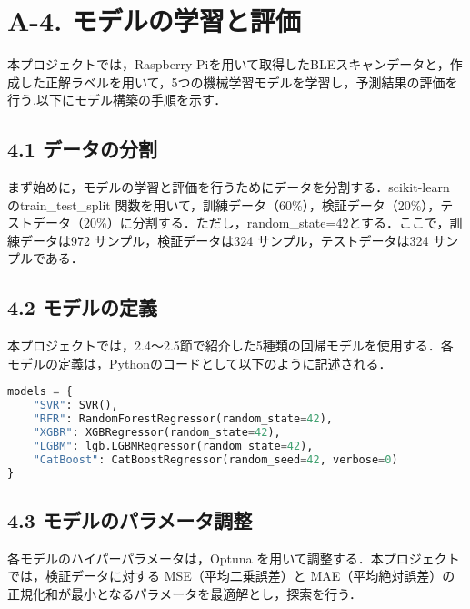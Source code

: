 \section*{A-4. モデルの学習と評価}
本プロジェクトでは，Raspberry Piを用いて取得したBLEスキャンデータと，作成した正解ラベルを用いて，5つの機械学習モデルを学習し，予測結果の評価を行う.以下にモデル構築の手順を示す．

\subsection*{4.1 データの分割}
まず始めに，モデルの学習と評価を行うためにデータを分割する．scikit-learn\cite{scikit-learn} のtrain\_test\_split 関数を用いて，訓練データ（60\%），検証データ（20\%），テストデータ（20\%）に分割する．ただし，random\_state=42とする．ここで，訓練データは972 サンプル，検証データは324 サンプル，テストデータは324 サンプルである．

\subsection*{4.2 モデルの定義}
本プロジェクトでは，2.4～2.5節で紹介した5種類の回帰モデルを使用する．各モデルの定義は，Pythonのコードとして以下のように記述される．
\begin{lstlisting}[style=mystyle, language=Python, caption=回帰モデルの定義, label={models}]
models = {
    "SVR": SVR(),
    "RFR": RandomForestRegressor(random_state=42),
    "XGBR": XGBRegressor(random_state=42),
    "LGBM": lgb.LGBMRegressor(random_state=42),
    "CatBoost": CatBoostRegressor(random_seed=42, verbose=0)
}
\end{lstlisting}

\subsection*{4.3 モデルのパラメータ調整}
各モデルのハイパーパラメータは，Optuna\cite{akiba2019optuna} を用いて調整する．本プロジェクトでは，検証データに対する MSE（平均二乗誤差）と MAE（平均絶対誤差）の正規化和が最小となるパラメータを最適解とし，探索を行う．

